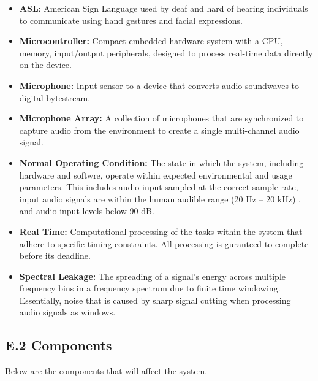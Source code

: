 \documentclass[12pt]{article}
\theoremstyle{definition}
\begin{document}
\begin{itemize}

  \item \textbf{ASL}: American Sign Language used by deaf and hard of hearing
  individuals to communicate using hand gestures and facial expressions.

  \item \textbf{Microcontroller:}\label{def:microcontroller} Compact embedded
  hardware system with a CPU, memory, input/output peripherals, designed to
  process real-time data directly on the device.

  \item \textbf{Microphone:}\label{def:microphone} Input sensor to a device that
  converts audio soundwaves to digital bytestream.

  \item \textbf{Microphone Array:}\label{def:microphone_array} A collection of
  microphones that are synchronized to capture audio from the environment to
  create a single multi-channel audio signal.

  \item \textbf{Normal Operating Condition:}
  \label{def:normal_operation_condition} The state in which the system,
  including hardware and softwre, operate within expected environmental and
  usage parameters. This includes audio input sampled at the correct sample
  rate, input audio signals are within the human audible range (20 Hz – 20 kHz)
  \cite{Neuroscience2001}, and audio input levels below 90 dB.

  \item \textbf{Real Time:} \label{def:real_time} Computational processing of
  the tasks within the system that adhere to specific timing constraints.
  All processing is guranteed to complete before its deadline.

  \item \textbf{Spectral Leakage:} \label{def:spectral_leakage} The spreading of
  a signal's energy across multiple frequency bins in a frequency spectrum due
  to finite time windowing. Essentially, noise that is caused by sharp signal
  cutting when processing audio signals as windows.

\end{itemize}

\subsection{E.2 Components}

Below are the components that will affect the system.
\end{document}
